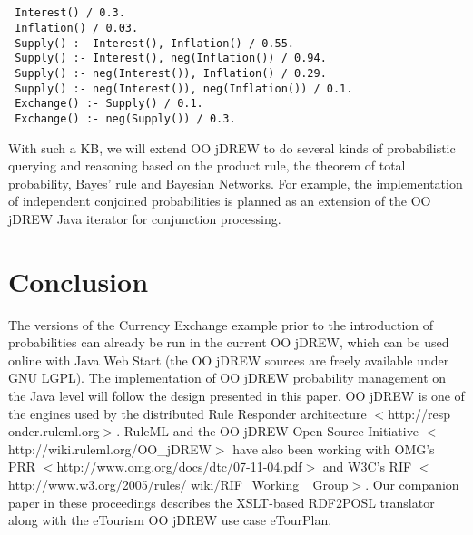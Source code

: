\documentclass [letterpaper] {Article}
\begin{document}
\begin{small}
\begin{small}
\singlespacing
\begin{verbatim}


 Interest() / 0.3.
 Inflation() / 0.03.
 Supply() :- Interest(), Inflation() / 0.55.
 Supply() :- Interest(), neg(Inflation()) / 0.94.
 Supply() :- neg(Interest()), Inflation() / 0.29.
 Supply() :- neg(Interest()), neg(Inflation()) / 0.1.
 Exchange() :- Supply() / 0.1.
 Exchange() :- neg(Supply()) / 0.3.
 \end{verbatim}
 \end{small}
 \vspace{-0.3in}
\hspace{0.3in}With such a KB, we will extend OO jDREW to do several kinds of probabilistic querying and reasoning based on the product rule, the theorem of total probability, Bayes' rule and Bayesian Networks. For example, the implementation of independent conjoined probabilities is planned as an extension of the OO jDREW Java iterator for conjunction processing.

\vspace{-0.25in}
\section{Conclusion}
\vspace{-0.2in}
\hspace{0.3in}The versions of the Currency Exchange example prior to the introduction of probabilities can already be run in the current OO jDREW,
which can be used online with Java Web Start (the OO jDREW sources are freely available under GNU LGPL).
The implementation of OO jDREW probability management on the Java level will follow the design presented in this paper.
OO jDREW is one of the engines used by the distributed
Rule Responder architecture $<$http://resp onder.ruleml.org$>$. RuleML and the OO jDREW Open Source Initiative $<$http://wiki.ruleml.org/OO\_jDREW$>$ have also been working with OMG's PRR $<$http://www.omg.org/docs/dtc/07-11-04.pdf$>$ and W3C's RIF $<$http://www.w3.org/2005/rules/ wiki/RIF\_Working \_Group$>$.
Our companion paper in these proceedings describes the XSLT-based \linebreak
RDF2POSL translator along with the eTourism OO jDREW use case eTourPlan.

\nocite{*}
\newpage
\singlespacing
%
%
\end{small}
\end{document}
